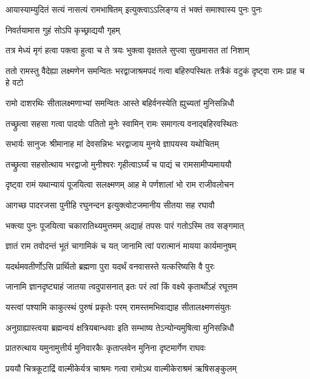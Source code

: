 \twolineshloka
{आयास्याम्युदितं सत्यं नासत्यं रामभाषितम्}
{इत्युक्त्वाऽऽलिङ्ग्य तं भक्तं समाश्वास्य पुनः पुनः} %

\onelineshloka
{निवर्तयामास गुहं सोऽपि कृच्छ्राद्ययौ गृहम्} %

\twolineshloka
{तत्र मेध्यं मृगं हत्वा पक्त्वा हुत्वा च ते त्रयः}
{भुक्त्वा वृक्षतले सुप्त्वा सुखमासत तां निशाम्} %

\threelineshloka
{ततो रामस्तु वैदेह्या लक्ष्मणेन समन्वितः}
{भरद्वाजाश्रमपदं गत्वा बहिरुपस्थितः}
{तत्रैकं वटुकं दृष्ट्वा रामः प्राह च हे वटो} %

\twolineshloka
{रामो दाशरथिः सीतालक्ष्मणाभ्यां समन्वितः}
{आस्ते बहिर्वनस्येति ह्युच्यतां मुनिसन्निधौ} %

\twolineshloka
{तच्छ्रुत्वा सहसा गत्वा पादयोः पतितो मुनेः}
{स्वामिन् रामः समागत्य वनाद्बहिरवस्थितः} %

\twolineshloka
{सभार्यः सानुजः श्रीमानाह मां देवसन्निभः}
{भरद्वाजाय मुनये ज्ञापयस्व यथोचितम्} %

\twolineshloka
{तच्छ्रुत्वा सहसोत्थाय भरद्वाजो मुनीश्वरः}
{गृहीत्वाऽर्घ्यं च पाद्यं च रामसामीप्यमाययौ} %

\twolineshloka
{दृष्ट्वा रामं यथान्यायं पूजयित्वा सलक्ष्मणम्}
{आह मे पर्णशालां भो राम राजीवलोचन} %

\twolineshloka
{आगच्छ पादरजसा पुनीहि रघुनन्दन}
{इत्युक्त्वोटजमानीय सीतया सह रघावौ} %

\twolineshloka
{भक्त्या पुनः पूजयित्वा चकारातिथ्यमुत्तमम्}
{अद्याहं तपसः पारं गतोऽस्मि तव सङ्गमात्} %

\twolineshloka
{ज्ञातं राम तवोदन्तं भूतं चागामिकं च यत्}
{जानामि त्वां परात्मानं मायया कार्यमानुषम्} %

\twolineshloka
{यदर्थमवतीर्णोऽसि प्रार्थितो ब्रह्मणा पुरा}
{यदर्थं वनवासस्ते यत्करिष्यसि वै पुरः} %

\twolineshloka
{जानामि ज्ञानदृष्ट्याहं जातया त्वदुपासनात्}
{इतः परं त्वां किं वक्ष्ये कृतार्थोऽहं रघूत्तम} %

\twolineshloka
{यस्त्वां पश्यामि काकुत्स्थं पुरुषं प्रकृतेः परम्}
{रामस्तमभिवाद्याह सीतालक्ष्मणसंयुतः} %

\twolineshloka
{अनुग्राह्यास्त्वया ब्रह्मन्वयं क्षत्रियबान्धवाः}
{इति सम्भाष्य तेऽन्योन्यमुषित्वा मुनिसन्निधौ} %

\twolineshloka
{प्रातरुत्थाय यमुनामुत्तीर्य मुनिवारकैः}
{कृताप्लवेन मुनिना दृष्टमार्गेण राघवः} %

\twolineshloka
{प्रययौ चित्रकूटाद्रिं वाल्मीकेर्यत्र चाश्रमः}
{गत्वा रामोऽथ वाल्मीकेराश्रमं ऋषिसङ्कुलम्} %

